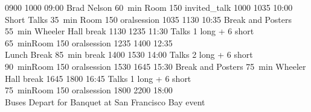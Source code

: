 \begin{timetable}
   {0900} {1000} {09:00 Brad Nelson}                 {60~min}                        {Room 150}                      {invited_talk}
   {1000} {1035} {10:00 Short Talks}                  {\vspace{1.5mm}35~min}          {\vspace{1.5mm}Room 150}        {oralsession}
   {1035} {1130} {10:35 Break and Posters}            {\vspace{1.5mm}55~min}          {Wheeler Hall}      {break}
   {1130} {1235} {11:30 Talks}                        {\vspace{-0.5em}1 long + 6 short\\65~min}{Room 150}             {oralsession}
   {1235} {1400} {12:35\\[0.2em]Lunch Break}          {85~min}                        {}                            {break}
   {1400} {1530} {14:00 Talks}                        {\vspace{-0.5em}2 long + 6 short\\90~min}{Room 150}             {oralsession}
   {1530} {1645} {15:30 Break and Posters}            {\vspace{1.5mm}75~min}          {Wheeler Hall}      {break}
   {1645} {1800} {16:45 Talks}                        {\vspace{-0.5em}1 long + 6 short\\75~min}{Room 150}             {oralsession}
   {1800} {2200} {18:00\\\vspace{0.3em}Buses Depart for Banquet}       {}          {\vspace{-0.7em}at San Francisco Bay}     {event}




\end{timetable}
